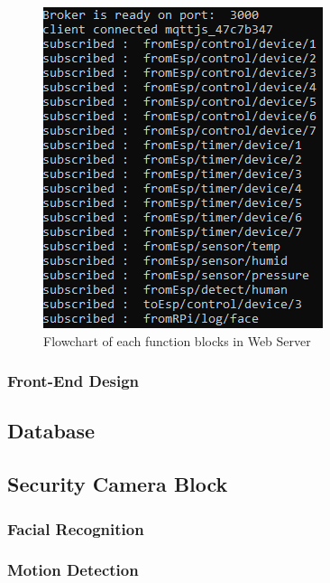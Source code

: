         \begin{figure}[!htb]
            \begin{center}
            \includegraphics[scale=0.8]{images/webSub.png}
            \caption{Flowchart of each function blocks in Web Server}
            \label{fig:responseBlock}
            \end{center}
        \end{figure}

        \subsubsection{Front-End Design}
    \subsection{Database} 
    \subsection{Security Camera Block}
        \subsubsection{Facial Recognition}
        \subsubsection{Motion Detection}

        





